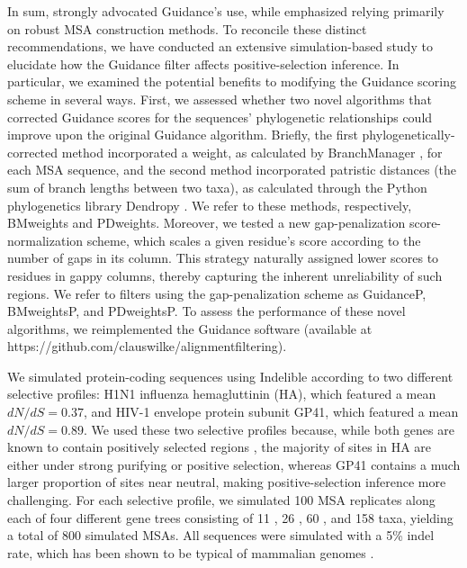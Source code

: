 \documentclass[11pt]{article}
\begin{document}
In sum, \citet{Privman2012} strongly advocated Guidance's use, while \citet{Jordan2012} emphasized relying primarily on robust MSA construction methods. To reconcile these distinct recommendations, we have conducted an extensive simulation-based study to elucidate how the Guidance filter affects positive-selection inference. In particular, we examined the potential benefits to modifying the Guidance scoring scheme in several ways.  First, we assessed whether two novel algorithms that corrected Guidance scores for the sequences' phylogenetic relationships could improve upon the original Guidance algorithm. Briefly, the first phylogenetically-corrected method incorporated a weight, as calculated by BranchManager \citep{Stone2007}, for each MSA sequence, and the second method incorporated patristic distances (the sum of branch lengths between two taxa), as calculated through the Python phylogenetics library Dendropy \citep{Sukumaran2010}. We refer to these methods, respectively, BMweights and PDweights. Moreover, we tested a new gap-penalization score-normalization scheme, which scales a given residue's score according to the number of gaps in its column. This strategy naturally assigned lower scores to residues in gappy columns, thereby capturing the inherent unreliability of such regions. We refer to filters using the gap-penalization scheme as GuidanceP, BMweightsP, and PDweightsP. To assess the performance of these novel algorithms, we reimplemented the Guidance software (available at https://github.com/clauswilke/alignment\underline{\hspace*{0.2cm}}filtering). 

We simulated protein-coding sequences using Indelible \citep{Fletcher2009} according to two different selective profiles: H1N1 influenza hemagluttinin (HA), which featured a mean $dN/dS = 0.37$, and HIV-1 envelope protein subunit GP41, which featured a mean $dN/dS = 0.89$. We used these two selective profiles because, while both genes are known to contain positively selected regions \citep{Bush1999, Frost2001, Bandawe2008, Meyer2012}, the majority of sites in HA are either under strong purifying or positive selection, whereas GP41  contains a much larger proportion of sites near neutral, making positive-selection inference more challenging. For each selective profile, we simulated 100 MSA replicates along each of four different gene trees consisting of 11 \citep{Spielman2013}, 26 \citep{Spielman2013}, 60 \citep{Yang2011}, and 158 \citep{Betancur2013} taxa, yielding a total of 800 simulated MSAs. All sequences were simulated with a 5\% indel rate, which has been shown to be typical of mammalian genomes \citep{Cooper2004}.
\end{document}
